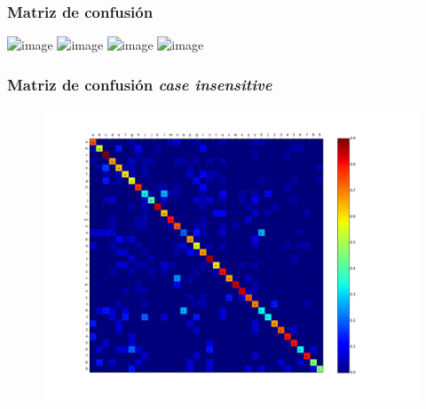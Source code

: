 		\begin{frame}
			\frametitle{Matriz de confusión}
			\includegraphics<1>[height=0.75\paperheight]{../img/resultados/mixtas/best_mean_matrix_Alpha0,01_2040-4.png}
			\includegraphics<2>[height=0.75\paperheight]{imgs/matriz_conf_diagonal_principal.png}
			\includegraphics<3>[height=0.75\paperheight]{imgs/matriz_conf_diagonal_secundaria.png}
			\includegraphics<4>[height=0.75\paperheight]{imgs/matriz_conf_confusion_simb.png}

		\end{frame}
		\begin{frame}
			\frametitle{Matriz de confusión \textit{case insensitive}}
			\begin{figure}[htbp!]
				\centering
				\centerline{
					\includegraphics[height=0.75\paperheight]{../img/resultados/mixtas/best_mean_matrix_Alpha0,01_2040-4_ins.png}
				}
			\end{figure}
		\end{frame}